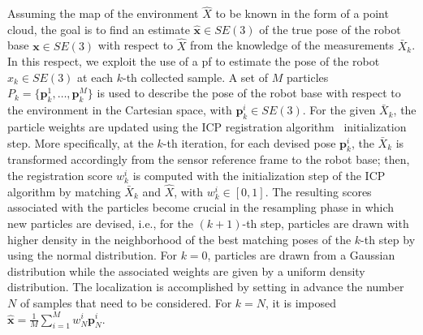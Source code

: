 Assuming the map of the environment $\hat{X}$ to be known in the form of a point cloud, the goal is to find an estimate $\hat{\mathbf{x}}\in SE(3)$ of the true pose of the robot base $\mathbf{x} \in SE(3)$ with respect to $\hat{X}$ from the knowledge of the measurements $\bar{X}_k$.
% 
In this respect, we exploit the use of a \gls{pf} to estimate the pose of the robot $\hat{x}_k \in SE(3)$ at each $k$-th collected sample. A set of $M$ particles $P_k=\lbrace \mathbf{p}_k^1, \dots, \mathbf{p}_k^M \rbrace$ is used to describe the pose of the robot base with respect to the environment in the Cartesian space, with $\mathbf{p}_k^i \in SE(3)$. For the given $\bar{X}_k$, the particle weights are updated using the ICP registration algorithm~\cite{besl1992method} initialization step. More specifically, at the $k$-th iteration, for each devised pose $\mathbf{p}_k^i$, the $\bar{X}_k$ is transformed accordingly from the sensor reference frame to the robot base; then, the registration score  $w_k^i$ is computed with the initialization step of the ICP algorithm by matching $\bar{X}_k$ and $\hat{X}$, with $w_k^i \in [0,1]$. The resulting scores associated with the particles become crucial in the resampling phase in which new particles are devised, i.e., for the $(k+1)$-th step, particles are drawn with higher density in the neighborhood of the best matching poses of the $k$-th step by using the normal distribution. For $k=0$, particles are drawn from a Gaussian distribution while the associated weights are given by a uniform density distribution. 
The localization is accomplished by setting in advance the number $N$ of samples that need to be considered. For $k=N$, it is imposed $\hat{\mathbf{x}}= \frac{1}{M}\sum_{i=1}^{M}w_N^i\mathbf{p}_N^i$.
